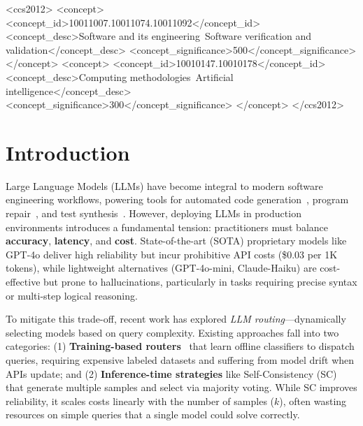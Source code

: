 \documentclass[acmsmall,screen,review,anonymous]{acmart}
\begin{document}
\begin{CCSXML}
<ccs2012>
   <concept>
       <concept_id>10011007.10011074.10011092</concept_id>
       <concept_desc>Software and its engineering~Software verification and validation</concept_desc>
       <concept_significance>500</concept_significance>
   </concept>
   <concept>
       <concept_id>10010147.10010178</concept_id>
       <concept_desc>Computing methodologies~Artificial intelligence</concept_desc>
       <concept_significance>300</concept_significance>
   </concept>
</ccs2012>
\end{CCSXML}



\maketitle

\section{Introduction}

Large Language Models (LLMs) have become integral to modern software engineering workflows, powering tools for automated code generation~\cite{chen2021codex}, program repair~\cite{xia2023automated}, and test synthesis~\cite{lemieux2023codamosa}. However, deploying LLMs in production environments introduces a fundamental tension: practitioners must balance \textbf{accuracy}, \textbf{latency}, and \textbf{cost}. State-of-the-art (SOTA) proprietary models like GPT-4o deliver high reliability but incur prohibitive API costs (\$0.03 per 1K tokens), while lightweight alternatives (GPT-4o-mini, Claude-Haiku) are cost-effective but prone to hallucinations, particularly in tasks requiring precise syntax or multi-step logical reasoning.

To mitigate this trade-off, recent work has explored \textit{LLM routing}—dynamically selecting models based on query complexity. Existing approaches fall into two categories: (1) \textbf{Training-based routers}~\cite{chen2023frugalgpt, ong2024routellm} that learn offline classifiers to dispatch queries, requiring expensive labeled datasets and suffering from model drift when APIs update; and (2) \textbf{Inference-time strategies} like Self-Consistency (SC)~\cite{wang2023selfconsistency} that generate multiple samples and select via majority voting. While SC improves reliability, it scales costs linearly with the number of samples ($k$), often wasting resources on simple queries that a single model could solve correctly.
\end{document}
